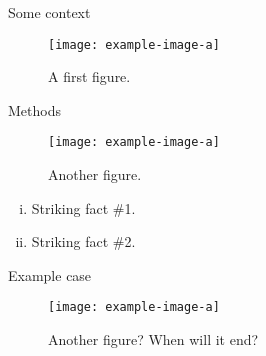 




\begin{frame}[t]
\begin{columns}[t]
      \separatorcolumn
      \begin{column}{\colwidth}
         \begin{block}{Some context}
            \lipsum[1-2]
            \begin{figure}
               \centering
               \texttt{[image: example-image-a]}
               \caption{%
                  A first figure.
               }
               \label{fig:compensation_scheme}
            \end{figure}
            \lipsum[3-4]
         \end{block}

         \begin{block}{Methods}
            \begin{figure}[hbtp]
               \texttt{[image: example-image-a]}
               \caption{%
                  Another figure.
               }
               \label{fig:jaea_structure}
            \end{figure}
            \lipsum[5]
            \begin{enumerate}[(i)]
               \item Striking fact \#1.
               \item Striking fact \#2.
            \end{enumerate}
         \end{block}

         \begin{block}{Example case}
            \begin{figure}[hbtp]
               \texttt{[image: example-image-a]}
               \caption{Another figure? When will it end?}
               \label{fig:flowchart}
            \end{figure}
         \end{block}


\end{column}
\end{columns}
\end{frame}

